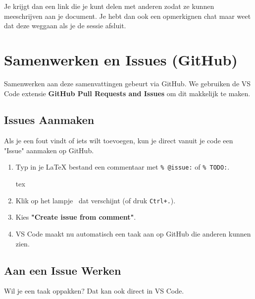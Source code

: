 \documentclass[a4paper,11pt]{article}
\begin{document}
 Je krijgt dan een link die je kunt delen met anderen zodat ze 
 kunnen meeschrijven aan je document. 
 Je hebt dan ook een opmerkignen chat maar weet dat deze
 weggaan als je de sessie afsluit.



\section{Samenwerken en Issues (GitHub)}
\label{sec:github}

Samenwerken aan deze samenvattingen gebeurt via GitHub. We gebruiken de VS Code extensie \textbf{GitHub Pull Requests and Issues} om dit makkelijk te maken.

\subsection{Issues Aanmaken}

Als je een fout vindt of iets wilt toevoegen, kun je direct vanuit je code een "Issue" aanmaken op GitHub.

\begin{oefenblok}
\begin{enumerate}
    \item Typ in je LaTeX bestand een commentaar met \texttt{\% @issue:} of \texttt{\% TODO:}.
    \begin{codeblock}[Voorbeeld]{tex}
    \end{codeblock}
    \item Klik op het lampje \faLightbulb\ dat verschijnt (of druk \texttt{Ctrl+.}).
    \item Kies \textbf{"Create issue from comment"}.
    \item VS Code maakt nu automatisch een taak aan op GitHub die anderen kunnen zien.
\end{enumerate}
\end{oefenblok}

\subsection{Aan een Issue Werken}

Wil je een taak oppakken? Dat kan ook direct in VS Code.
\end{document}
